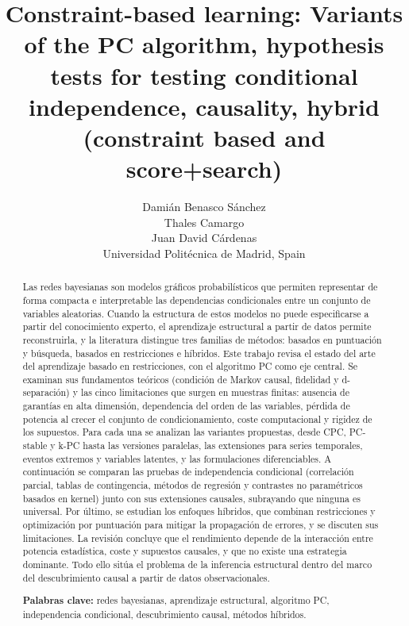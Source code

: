 \documentclass[a4paper,11pt]{article}
\begin{document}
\title{Constraint-based learning: Variants of the PC algorithm, hypothesis tests for testing conditional
independence, causality, hybrid (constraint based and score+search)}

\author{
Damián Benasco Sánchez\\
Thales Camargo\\
Juan David Cárdenas\\
{\small Universidad Politécnica de Madrid, Spain}
}

\date{}

\maketitle

\begin{abstract}
Las redes bayesianas son modelos gráficos probabilísticos que permiten representar de forma compacta e interpretable las dependencias condicionales entre un conjunto de variables aleatorias. Cuando la estructura de estos modelos no puede especificarse a partir del conocimiento experto, el aprendizaje estructural a partir de datos permite reconstruirla, y la literatura distingue tres familias de métodos: basados en puntuación y búsqueda, basados en restricciones e híbridos. Este trabajo revisa el estado del arte del aprendizaje basado en restricciones, con el algoritmo PC como eje central. Se examinan sus fundamentos teóricos (condición de Markov causal, fidelidad y d-separación) y las cinco limitaciones que surgen en muestras finitas: ausencia de garantías en alta dimensión, dependencia del orden de las variables, pérdida de potencia al crecer el conjunto de condicionamiento, coste computacional y rigidez de los supuestos. Para cada una se analizan las variantes propuestas, desde CPC, PC-stable y k-PC hasta las versiones paralelas, las extensiones para series temporales, eventos extremos y variables latentes, y las formulaciones diferenciables. A continuación se comparan las pruebas de independencia condicional (correlación parcial, tablas de contingencia, métodos de regresión y contrastes no paramétricos basados en kernel) junto con sus extensiones causales, subrayando que ninguna es universal. Por último, se estudian los enfoques híbridos, que combinan restricciones y optimización por puntuación para mitigar la propagación de errores, y se discuten sus limitaciones. La revisión concluye que el rendimiento depende de la interacción entre potencia estadística, coste y supuestos causales, y que no existe una estrategia dominante. Todo ello sitúa el problema de la inferencia estructural dentro del marco del descubrimiento causal a partir de datos observacionales.

\textbf{Palabras clave:} redes bayesianas, aprendizaje estructural, algoritmo PC, independencia condicional, descubrimiento causal, métodos híbridos.
\end{abstract}







\appendix
\newpage

\clearpage



\end{document}
